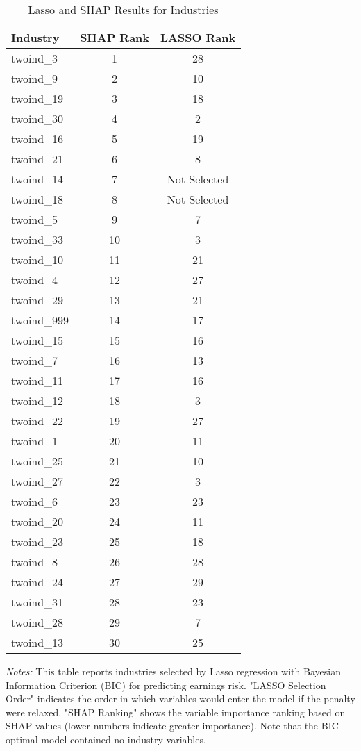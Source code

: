 \documentclass[12pt]{article}
\begin{document}
\begin{table}[H]
\centering

\caption{Lasso and SHAP Results for Industries}

\begin{tabular}{lcc}

\toprule
Industry & SHAP Rank & LASSO Rank\\
\midrule
twoind\_3 & 1 & 28 \\
twoind\_9 & 2 & 10 \\
twoind\_19 & 3 & 18 \\
twoind\_30 & 4 & 2 \\
twoind\_16 & 5 & 19 \\
twoind\_21 & 6 & 8 \\
twoind\_14 & 7 & Not Selected \\
twoind\_18 & 8 & Not Selected \\
twoind\_5 & 9 & 7 \\
twoind\_33 & 10 & 3 \\
twoind\_10 & 11 & 21 \\
twoind\_4 & 12 & 27 \\
twoind\_29 & 13 & 21 \\
twoind\_999 & 14 & 17 \\
twoind\_15 & 15 & 16 \\
twoind\_7 & 16 & 13 \\
twoind\_11 & 17 & 16 \\
twoind\_12 & 18 & 3 \\
twoind\_22 & 19 & 27 \\
twoind\_1 & 20 & 11 \\
twoind\_25 & 21 & 10 \\
twoind\_27 & 22 & 3 \\
twoind\_6 & 23 & 23 \\
twoind\_20 & 24 & 11 \\
twoind\_23 & 25 & 18 \\
twoind\_8 & 26 & 28 \\
twoind\_24 & 27 & 29 \\
twoind\_31 & 28 & 23 \\
twoind\_28 & 29 & 7 \\
twoind\_13 & 30 & 25 \\
\bottomrule
\end{tabular}%
\newline

\footnotesize
\textit{Notes:} This table reports industries selected by Lasso regression with Bayesian Information Criterion (BIC) for predicting earnings risk. "LASSO Selection Order" indicates the order in which variables would enter the model if the penalty were relaxed. "SHAP Ranking" shows the variable importance ranking based on SHAP values (lower numbers indicate greater importance). Note that the BIC-optimal model contained no industry variables.

\end{table}
\end{document}
